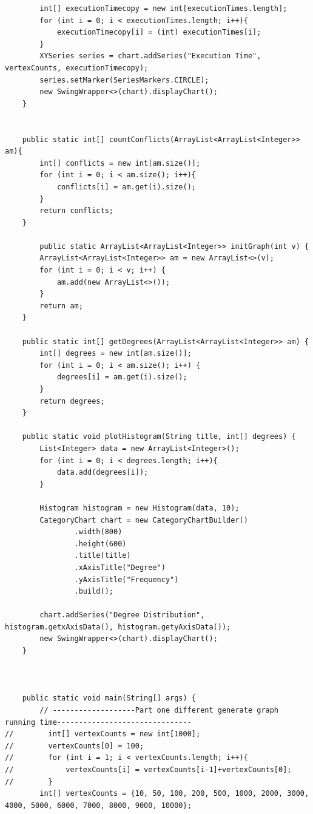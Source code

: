 \documentclass{article}
\begin{document}
\begin{verbatim}
        int[] executionTimecopy = new int[executionTimes.length];
        for (int i = 0; i < executionTimes.length; i++){
            executionTimecopy[i] = (int) executionTimes[i];
        }
        XYSeries series = chart.addSeries("Execution Time", vertexCounts, executionTimecopy);
        series.setMarker(SeriesMarkers.CIRCLE);
        new SwingWrapper<>(chart).displayChart();
    }


    public static int[] countConflicts(ArrayList<ArrayList<Integer>> am){
        int[] conflicts = new int[am.size()];
        for (int i = 0; i < am.size(); i++){
            conflicts[i] = am.get(i).size();
        }
        return conflicts;
    }

        public static ArrayList<ArrayList<Integer>> initGraph(int v) {
        ArrayList<ArrayList<Integer>> am = new ArrayList<>(v);
        for (int i = 0; i < v; i++) {
            am.add(new ArrayList<>());
        }
        return am;
    }

    public static int[] getDegrees(ArrayList<ArrayList<Integer>> am) {
        int[] degrees = new int[am.size()];
        for (int i = 0; i < am.size(); i++) {
            degrees[i] = am.get(i).size();
        }
        return degrees;
    }

    public static void plotHistogram(String title, int[] degrees) {
        List<Integer> data = new ArrayList<Integer>();
        for (int i = 0; i < degrees.length; i++){
            data.add(degrees[i]);
        }

        Histogram histogram = new Histogram(data, 10);
        CategoryChart chart = new CategoryChartBuilder()
                .width(800)
                .height(600)
                .title(title)
                .xAxisTitle("Degree")
                .yAxisTitle("Frequency")
                .build();

        chart.addSeries("Degree Distribution", histogram.getxAxisData(), histogram.getyAxisData());
        new SwingWrapper<>(chart).displayChart();
    }



    public static void main(String[] args) {
        // -------------------Part one different generate graph running time-------------------------------
//        int[] vertexCounts = new int[1000];
//        vertexCounts[0] = 100;
//        for (int i = 1; i < vertexCounts.length; i++){
//            vertexCounts[i] = vertexCounts[i-1]+vertexCounts[0];
//        }
        int[] vertexCounts = {10, 50, 100, 200, 500, 1000, 2000, 3000, 4000, 5000, 6000, 7000, 8000, 9000, 10000};


\end{verbatim}
\end{document}
